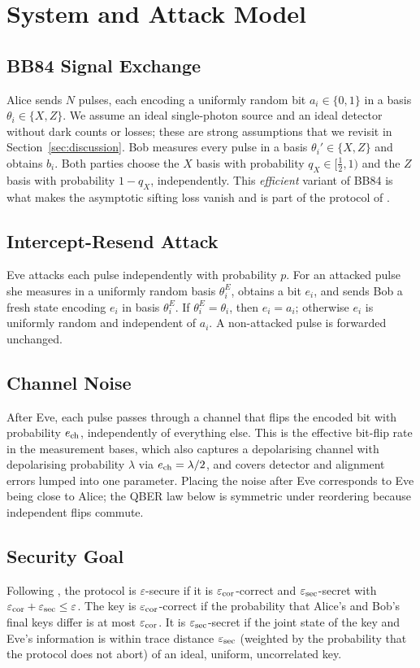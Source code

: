 \section{System and Attack Model}\label{sec:model}

\subsection{BB84 Signal Exchange}
Alice sends $N$ pulses, each encoding a uniformly random bit $a_i\in\{0,1\}$ in a basis $\theta_i\in\{X,Z\}$. We assume an ideal single-photon source and an ideal detector without dark counts or losses; these are strong assumptions that we revisit in Section~\ref{sec:discussion}. Bob measures every pulse in a basis $\theta_i'\in\{X,Z\}$ and obtains $b_i$. Both parties choose the $X$ basis with probability $q_X\in[\tfrac12,1)$ and the $Z$ basis with probability $1-q_X$, independently. This \emph{efficient} variant of BB84 is what makes the asymptotic sifting loss vanish and is part of the protocol of \cite{Tomamichel12}.

\subsection{Intercept-Resend Attack}
Eve attacks each pulse independently with probability $p$. For an attacked pulse she measures in a uniformly random basis $\theta^{E}_i$, obtains a bit $e_i$, and sends Bob a fresh state encoding $e_i$ in basis $\theta^E_i$. If $\theta^E_i=\theta_i$, then $e_i=a_i$; otherwise $e_i$ is uniformly random and independent of $a_i$. A non-attacked pulse is forwarded unchanged.

\subsection{Channel Noise}
After Eve, each pulse passes through a channel that flips the encoded bit with probability $e_{\mathrm{ch}}$, independently of everything else. This is the effective bit-flip rate in the measurement bases, which also captures a depolarising channel with depolarising probability $\lambda$ via $e_{\mathrm{ch}}=\lambda/2$, and covers detector and alignment errors lumped into one parameter. Placing the noise after Eve corresponds to Eve being close to Alice; the QBER law below is symmetric under reordering because independent flips commute.

\subsection{Security Goal}
Following \cite{Renner05,Tomamichel12}, the protocol is $\varepsilon$-secure if it is $\varepsilon_{\mathrm{cor}}$-correct and $\varepsilon_{\mathrm{sec}}$-secret with $\varepsilon_{\mathrm{cor}}+\varepsilon_{\mathrm{sec}}\le\varepsilon$. The key is $\varepsilon_{\mathrm{cor}}$-correct if the probability that Alice's and Bob's final keys differ is at most $\varepsilon_{\mathrm{cor}}$. It is $\varepsilon_{\mathrm{sec}}$-secret if the joint state of the key and Eve's information is within trace distance $\varepsilon_{\mathrm{sec}}$ (weighted by the probability that the protocol does not abort) of an ideal, uniform, uncorrelated key.

